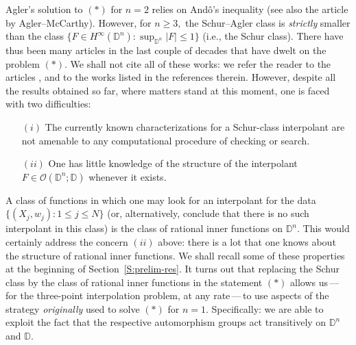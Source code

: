 \documentclass[11pt, reqno]{amsart}
\numberwithin{equation}{section}
\theoremstyle{definition}
\theoremstyle{remark}
\theoremstyle{plain}
\begin{document}
Agler's solution to $(*)$ for $n=2$ relies on And\^{o}'s inequality \cite{ando:ftp63}
(see also the article \cite{agmac:ftp99} by Agler--McCarthy). However, for $n\geq 3,$ the
Schur--Agler class is {\em strictly} smaller than the class $\{F\in H^{\infty}({\mathbb{D}}^n):\sup_{{\mathbb{D}}^n}|F|\leq 1\}$
(i.e., the Schur class). There have thus been many articles in the last couple of decades that have dwelt on the problem
$(*).$ We shall not cite all of these works: we refer the reader to the articles \cite{cw:ftp94},
\cite{ham:ftp013} and to the works listed in the references therein. However, despite all the results obtained so far,
where matters stand at this moment, one is faced with two difficulties:
\begin{itemize}
\item[$(i)$] The currently known characterizations for a Schur-class interpolant are not amenable to any computational
procedure of checking or search.
\item[$(ii)$] One has little knowledge of the structure of the interpolant $F\in{\mathcal{O}}({\mathbb{D}}^n;{\mathbb{D}})$ whenever it exists.
\end{itemize}
\smallskip

A class of functions in which one may look for an interpolant for the data $\{(X_j,w_j):1\leq j\leq N\}$
(or, alternatively, conclude that there is no such interpolant in this class) is the class of 
rational inner functions on ${\mathbb{D}}^n.$ This would certainly address the concern $(ii)$ above: there is a lot
that one knows about the structure of rational inner functions. We shall recall some of these properties at
the beginning of Section~\ref{S:prelim-res}. It turns out that replacing the Schur class by the class of rational
inner functions in the statement $(*)$ allows us\,---\,for the three-point interpolation problem,
at any rate\,---\,to use aspects of the strategy {\em originally} used to solve $(*)$ for
$n=1.$ Specifically: we are able to exploit the fact that the respective automorphism groups act transitively on ${\mathbb{D}}^n$
and ${\mathbb{D}}.$
\smallskip
\end{document}
